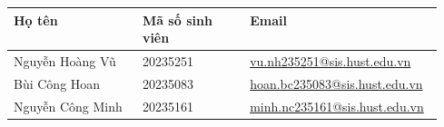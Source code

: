 \documentclass[11pt,a4paper]{article}
\newcommand{\muc}[1]{\par\vspace{0.5em}{\large\bfseries #1}\par\vspace{0.15em}}
\begin{document}
\muc{5. Thành viên}
\begin{tabularx}{\linewidth}{@{}p{0.3\linewidth}p{0.25\linewidth}X@{}}
  \toprule
  \textbf{Họ tên} & \textbf{Mã số sinh viên} & \textbf{Email} \\
  \midrule
  Nguyễn Hoàng Vũ  & 20235251 & \href{mailto:vu.nh235251@sis.hust.edu.vn}{vu.nh235251@sis.hust.edu.vn} \\
  Bùi Công Hoan    & 20235083 & \href{mailto:hoan.bc235083@sis.hust.edu.vn}{hoan.bc235083@sis.hust.edu.vn} \\
  Nguyễn Công Minh & 20235161 & \href{mailto:minh.nc235161@sis.hust.edu.vn}{minh.nc235161@sis.hust.edu.vn} \\
  \bottomrule
\end{tabularx}
\end{document}
